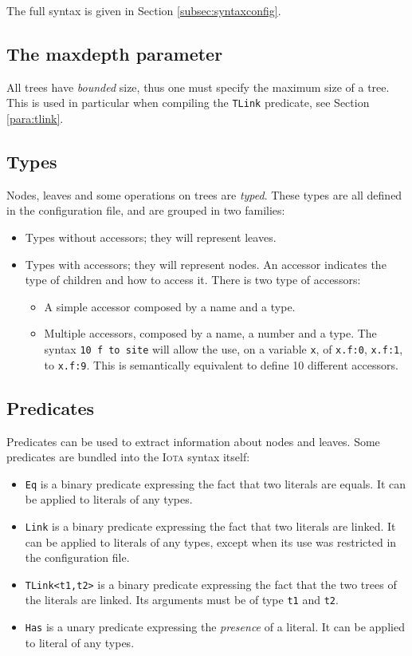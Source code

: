 \documentclass[10pt,a4paper]{article}
\newcommand\Iota{\textsc{Iota}}
\newcommand{\ocaml}{\texttt}
\begin{document}
The full syntax is given in Section \ref{subsec:syntaxconfig}.
\subsection{The maxdepth parameter}
All trees have \emph{bounded} size, thus one must specify the maximum size of a tree. This is used in particular when compiling the \ocaml{TLink} predicate, see Section \ref{para:tlink}.

\subsection{Types}
Nodes, leaves and some operations on trees are \emph{typed}. These types are all defined in the configuration file, and are grouped in two families:
\begin{itemize}
\item Types without accessors; they will represent leaves.
\item Types with accessors; they will represent nodes. An accessor indicates the type of children and how to access it. There is two type of accessors:
  \begin{itemize}
  \item A simple accessor composed by a name and a type.
  \item Multiple accessors, composed by a name, a number and a type. The syntax \ocaml{10 f to site} will allow the use, on a variable \ocaml{x}, of \ocaml{x.f:0}, \ocaml{x.f:1}, to \ocaml{x.f:9}. This is semantically equivalent to define 10 different accessors.
  \end{itemize}
\end{itemize}

\subsection{Predicates}
\label{subsec:predicates}
Predicates can be used to extract information about nodes and leaves. Some predicates are bundled into the \Iota{} syntax itself:
\begin{itemize}
\item \ocaml{Eq} is a binary predicate expressing the fact that two literals are equals. It can be applied to literals of any types.
\item \ocaml{Link} is a binary predicate expressing the fact that two literals are linked. It can be applied to literals of any types, except when its use was restricted in the configuration file.
\item \ocaml{TLink<t1,t2>} is a binary predicate expressing the fact that the two trees of the literals are linked. Its arguments must be of type \ocaml{t1} and \ocaml{t2}.
\item \ocaml{Has} is a unary predicate expressing the \emph{presence} of a literal. It can be applied to literal of any types.
\end{itemize}
\end{document}
